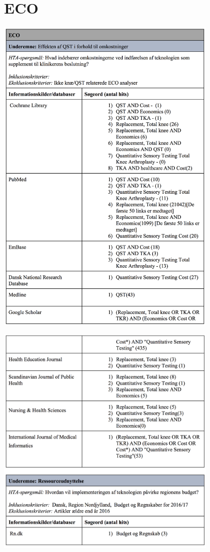 \section{ECO}
\includegraphics[width=0.8\textwidth]{rapportAfsnit/qBilag/sogninger/ECO1}

\includegraphics[width=0.8\textwidth]{rapportAfsnit/qBilag/sogninger/ECO2}







